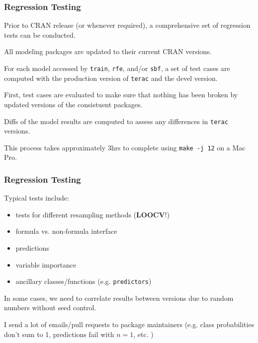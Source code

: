 \documentclass[12 pt]{beamer}\usepackage[]{graphicx}\usepackage[]{color}
\newcommand{\hlkwd}[1]{\textcolor[rgb]{0.78,0.227,0.412}{#1}}%
\newcommand{\mxkwd}[1]{\texttt{\hlkwd{#1}}}%
\newcommand{\pkg}[1]{{\fontseries{b}\selectfont #1}}
\renewcommand{\pkg}[1]{{\color{darkgreen}\texttt{#1}}}
\begin{document}

  \begin{frame}[fragile]
\frametitle{Regression Testing}

Prior to CRAN release (or whenever required), a comprehensive set of regression tests can be  conducted.

\vspace{.1in}

All modeling packages are updated to their current CRAN versions.

\vspace{.1in}

For each model accessed by \mxkwd{train}, \mxkwd{rfe}, and/or \mxkwd{sbf}, a set of test cases are computed with the production version of \pkg{terac} and the devel version.

\vspace{.1in}

First, test cases are evaluated to make sure that nothing has been broken by updated versions of the consistuent packages.

\vspace{.1in}

Diffs of the model results are computed to assess any differences in \pkg{terac} versions.

\vspace{.1in}

This process takes approximately 3hrs to complete using \texttt{make -j 12} on a Mac Pro.

\end{frame}



  \begin{frame}[fragile]
\frametitle{Regression Testing}

Typical tests include:
\begin{itemize}
\item tests for different resampling methods ({\bf LOOCV}!)
\item formula vs. non-formula interface
\item predictions
\item variable importance
\item ancillary classes/functions (e.g. \mxkwd{predictors})
\end{itemize}

\vspace{.1in}

In some cases, we need to correlate results between versions due to random numbers without seed control.

\vspace{.1in}

I send a lot of emails/pull requests to package maintainers (e.g. class probabilities don't sum to 1, predictions fail with $n=1$, etc. )

\end{frame}
\end{document}
